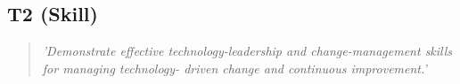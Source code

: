 \subsection*{T2 (Skill)}

  \begin{quote}
    \textit{'Demonstrate effective technology-leadership
    and change-management skills for managing technology-
    driven change and continuous improvement.'}
  \end{quote}

\newpage